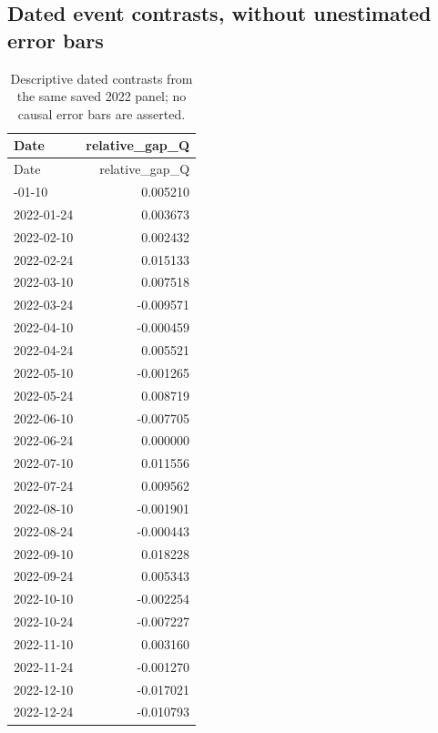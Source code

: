 \subsection{Dated event contrasts, without unestimated error bars}
\begin{longtable}{lr}
\caption{Descriptive dated contrasts from the same saved 2022 panel; no causal error bars are asserted.}\\
\toprule Date & relative\_gap\_Q\\\midrule\endfirsthead
\toprule Date & relative\_gap\_Q\\\midrule\endhead
\bottomrule\endfoot
2022-01-10 & 0.005210\\
2022-01-24 & 0.003673\\
2022-02-10 & 0.002432\\
2022-02-24 & 0.015133\\
2022-03-10 & 0.007518\\
2022-03-24 & -0.009571\\
2022-04-10 & -0.000459\\
2022-04-24 & 0.005521\\
2022-05-10 & -0.001265\\
2022-05-24 & 0.008719\\
2022-06-10 & -0.007705\\
2022-06-24 & 0.000000\\
2022-07-10 & 0.011556\\
2022-07-24 & 0.009562\\
2022-08-10 & -0.001901\\
2022-08-24 & -0.000443\\
2022-09-10 & 0.018228\\
2022-09-24 & 0.005343\\
2022-10-10 & -0.002254\\
2022-10-24 & -0.007227\\
2022-11-10 & 0.003160\\
2022-11-24 & -0.001270\\
2022-12-10 & -0.017021\\
2022-12-24 & -0.010793\\
\end{longtable}
